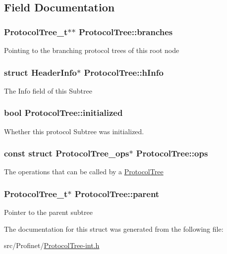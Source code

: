 \subsection{Field Documentation}
\hypertarget{struct_protocol_tree_aab7be83543870f7313efbec39b72385f}{
\subsubsection[{branches}]{\setlength{\rightskip}{0pt plus 5cm}Protocol\-Tree\-\_\-t$\ast$$\ast$ Protocol\-Tree\-::branches}}\label{struct_protocol_tree_aab7be83543870f7313efbec39b72385f}
Pointing to the branching protocol trees of this root node \hypertarget{struct_protocol_tree_a8fce6fc18afa7ddd1fa4f8895064d1ba}{
\subsubsection[{h\-Info}]{\setlength{\rightskip}{0pt plus 5cm}struct {\bf Header\-Info}$\ast$ Protocol\-Tree\-::h\-Info}}\label{struct_protocol_tree_a8fce6fc18afa7ddd1fa4f8895064d1ba}
The Info field of this Subtree \hypertarget{struct_protocol_tree_a6d4f209acc4331cbb440df967d7a4054}{
\subsubsection[{initialized}]{\setlength{\rightskip}{0pt plus 5cm}bool Protocol\-Tree\-::initialized}}\label{struct_protocol_tree_a6d4f209acc4331cbb440df967d7a4054}
Whether this protocol Subtree was initialized. \hypertarget{struct_protocol_tree_aad4c24f365eae4e59887dc5753a0d891}{
\subsubsection[{ops}]{\setlength{\rightskip}{0pt plus 5cm}const struct {\bf Protocol\-Tree\-\_\-ops}$\ast$ Protocol\-Tree\-::ops}}\label{struct_protocol_tree_aad4c24f365eae4e59887dc5753a0d891}
The operations that can be called by a \hyperlink{struct_protocol_tree}{Protocol\-Tree} \hypertarget{struct_protocol_tree_a4d7aa1ac9fb932c4a4a7ebc140066ab1}{
\subsubsection[{parent}]{\setlength{\rightskip}{0pt plus 5cm}Protocol\-Tree\-\_\-t$\ast$ Protocol\-Tree\-::parent}}\label{struct_protocol_tree_a4d7aa1ac9fb932c4a4a7ebc140066ab1}
Pointer to the parent subtree 

The documentation for this struct was generated from the following file\-:\begin{DoxyCompactItemize}
\item 
src/\-Profinet/\hyperlink{_protocol_tree-int_8h}{Protocol\-Tree-\/int.\-h}\end{DoxyCompactItemize}
